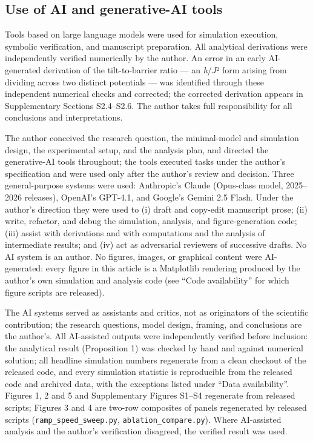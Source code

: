 \documentclass[11pt,letterpaper]{article}
\begin{document}
\subsection{Use of AI and generative-AI tools}\label{use-of-ai-and-generative-ai-tools}

Tools based on large language models were used for simulation execution, symbolic verification, and manuscript preparation. All analytical derivations were independently verified numerically by the author. An error in an early AI-generated derivation of the tilt-to-barrier ratio --- an \emph{h}/\emph{J}² form arising from dividing across two distinct potentials --- was identified through these independent numerical checks and corrected; the corrected derivation appears in Supplementary Sections S2.4--S2.6. The author takes full responsibility for all conclusions and interpretations.

The author conceived the research question, the minimal-model and simulation design, the experimental setup, and the analysis plan, and directed the generative-AI tools throughout; the tools executed tasks under the author's specification and were used only after the author's review and decision. Three general-purpose systems were used: Anthropic's Claude (Opus-class model, 2025--2026 releases), OpenAI's GPT-4.1, and Google's Gemini 2.5 Flash. Under the author's direction they were used to (i) draft and copy-edit manuscript prose; (ii) write, refactor, and debug the simulation, analysis, and figure-generation code; (iii) assist with derivations and with computations and the analysis of intermediate results; and (iv) act as adversarial reviewers of successive drafts. No AI system is an author. No figures, images, or graphical content were AI-generated: every figure in this article is a Matplotlib rendering produced by the author's own simulation and analysis code (see ``Code availability'' for which figure scripts are released).

The AI systems served as assistants and critics, not as originators of the scientific contribution; the research questions, model design, framing, and conclusions are the author's. All AI-assisted outputs were independently verified before inclusion: the analytical result (Proposition 1) was checked by hand and against numerical solution; all headline simulation numbers regenerate from a clean checkout of the released code, and every simulation statistic is reproducible from the released code and archived data, with the exceptions listed under ``Data availability''. Figures 1, 2 and 5 and Supplementary Figures S1--S4 regenerate from released scripts; Figures 3 and 4 are two-row composites of panels regenerated by released scripts (\texttt{ramp\_speed\_sweep.py}, \texttt{ablation\_compare.py}). Where AI-assisted analysis and the author's verification disagreed, the verified result was used.
\end{document}
